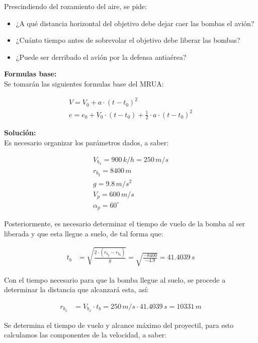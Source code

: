 \documentclass[11pt,letterpaper]{article}
\begin{document}
Prescindiendo del rozamiento del aire, se pide:

\begin{itemize}
  \item ¿A qué distancia horizontal del objetivo debe dejar caer las bombas el avión?
  \item ¿Cuánto tiempo antes de sobrevolar el objetivo debe liberar las bombas?
  \item ¿Puede ser derribado el avión por la defensa antiaérea?
\end{itemize}

\textbf{Formulas base:}\\

Se tomarán las siguientes formulas base del MRUA:

\begin{align}
\boxed{ V = V_{0} + a \cdot (t - t_{0})^2}\\
\boxed{ e = e_{0} + V_{0} \cdot (t - t_{0}) + \frac{1}{2} \cdot a \cdot (t - t_{0})^2 }
\end{align}

\textbf{Solución:}\\

Es necesario organizar los parámetros dados, a saber:

\begin{align*}
V_{b_{x}} = 900\,k/h = 250\,m/s\\
r_{b_{y}} = 8400\,m\\
g = 9.8\,m/s^2\\
V_{p} = 600\,m/s\\
\alpha_{p} = 60^{\circ}
\end{align*}

Posteriormente, es necesario determinar el tiempo de vuelo de la bomba al ser liberada y que esta llegue a suelo, de tal forma que:

\begin{align}
t_{b} &= \sqrt{\frac{2 \cdot (r_{b_{y}} - r_{b_{0}})}{g}} = \sqrt{\frac{-8400}{-4.9}} = 41.4039\,s
\end{align}

Con el tiempo necesario para que la bomba llegue al suelo, se procede a determinar la distancia que alcanzará esta, así:

\begin{align}
r_{b_{x}} &= V_{b_{x}} \cdot t_{b} = 250\,m/s \cdot 41.4039\,s = 10331\,m
\end{align}

Se determina el tiempo de vuelo y alcance máximo del proyectil, para esto calculamos las componentes de la velocidad, a saber:
\end{document}
